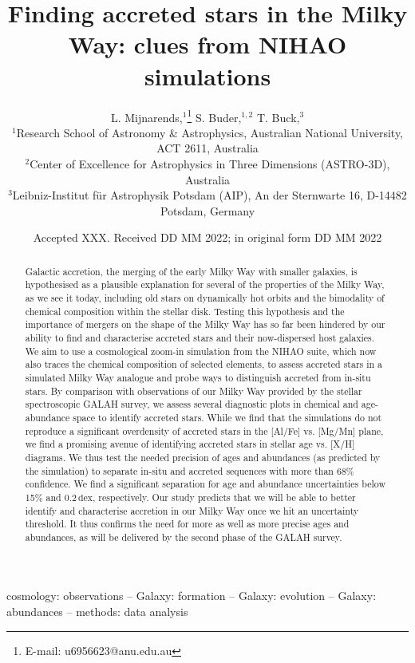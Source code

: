 \documentclass[fleqn,usenatbib]{mnras}
\title[Accreted stars in NIHAO]{Finding accreted stars in the Milky Way: clues from NIHAO simulations}
\author[L. Mijnarends et al.]{
L. Mijnarends,$^{1}$\thanks{E-mail: u6956623@anu.edu.au}
S. Buder,$^{1,2}$
T. Buck,$^{3}$
\\
$^{1}$Research School of Astronomy \& Astrophysics, Australian National University, ACT 2611, Australia\\
$^{2}$Center of Excellence for Astrophysics in Three Dimensions (ASTRO-3D), Australia\\
$^{3}$Leibniz-Institut f{\"u}r Astrophysik Potsdam (AIP), An der Sternwarte 16, D-14482 Potsdam, Germany\\
}
\date{Accepted XXX. Received DD MM 2022; in original form DD MM 2022}
\begin{document}
\label{firstpage}
\pagerange{\pageref{firstpage}--\pageref{lastpage}}
\maketitle

\begin{abstract}
Galactic accretion, the merging of the early Milky Way with smaller galaxies, is hypothesised as a plausible explanation for several of the properties of the Milky Way, as we see it today, including old stars on dynamically hot orbits and the bimodality of chemical composition within the stellar disk. Testing this hypothesis and the importance of mergers on the shape of the Milky Way has so far been hindered by our ability to find and characterise accreted stars and their now-dispersed host galaxies.
We aim to use a cosmological zoom-in simulation from the NIHAO suite, which now also traces the chemical composition of selected elements, to assess accreted stars in a simulated Milky Way analogue and probe ways to distinguish accreted from in-situ stars.
By comparison with observations of our Milky Way provided by the stellar spectroscopic GALAH survey, we assess several diagnostic plots in chemical and age-abundance space to identify accreted stars.
While we find that the simulations do not reproduce a significant overdensity of accreted stars in the [Al/Fe] vs. [Mg/Mn] plane, we find a promising avenue of identifying accreted stars in stellar age vs. [X/H] diagrams. We thus test the needed precision of ages and abundances (as predicted by the simulation) to separate in-situ and accreted sequences with more than 68\% confidence. We find a significant separation for age and abundance uncertainties below 15\% and $0.2\,\mathrm{dex}$, respectively.
Our study predicts that we will be able to better identify and characterise accretion in our Milky Way once we hit an uncertainty threshold. It thus confirms the need for more as well as more precise ages and abundances, as will be delivered by the second phase of the GALAH survey.
\end{abstract}

\begin{keywords}
cosmology: observations -- Galaxy: formation -- Galaxy: evolution -- Galaxy: abundances -- methods: data analysis
\end{keywords}
\end{document}
